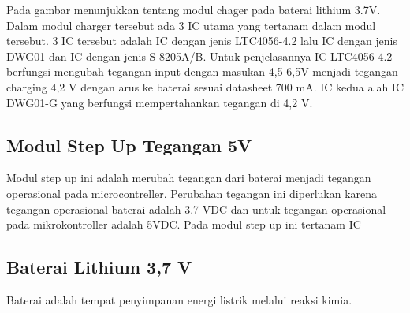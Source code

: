 \documentclass[11pt]{article}
\begin{document}
Pada gambar menunjukkan tentang modul chager pada baterai lithium 3.7V.
Dalam modul charger tersebut ada 3 IC utama yang tertanam dalam modul tersebut.
3 IC tersebut adalah  IC dengan jenis LTC4056-4.2 lalu IC dengan jenis DWG01 dan IC dengan jenis S-8205A/B.
Untuk penjelasannya IC  LTC4056-4.2 berfungsi mengubah tegangan input dengan masukan 4,5-6,5V menjadi tegangan charging 4,2 V dengan arus ke baterai sesuai datasheet 700 mA.
IC kedua alah IC DWG01-G yang berfungsi mempertahankan tegangan di 4,2 V.

\subsection{Modul Step Up Tegangan 5V}
Modul step up ini adalah merubah tegangan dari baterai menjadi tegangan operasional pada microcontreller.
Perubahan tegangan ini diperlukan karena tegangan operasional baterai adalah 3.7 VDC dan untuk tegangan operasional pada mikrokontroller adalah 5VDC.
Pada modul step up ini tertanam IC 

\subsection{Baterai Lithium 3,7 V}
Baterai adalah tempat penyimpanan energi listrik melalui reaksi kimia. 
\end{document}
